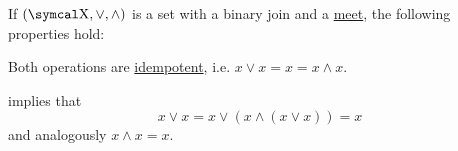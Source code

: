 \begin{Proposition}\label{thm:binary_lattice_operations_properties}
  If \( (\CX, \vee, \wedge) \) is a set with a binary join and a \hyperref[def:binary_lattice_operations]{meet}, the following properties hold:
  \begin{DefEnum}
     Both operations are \hyperref[def:algebraic_theory/idempotent_element]{idempotent}, i.e. \( x \vee x = x = x \wedge x \).
  \end{DefEnum}
\end{Proposition}
\begin{RefListProof}
      implies that
    \begin{equation*}
      x \vee x = x \vee (x \wedge (x \vee x)) = x
    \end{equation*}
    and analogously \( x \wedge x = x \).
\end{RefListProof}


